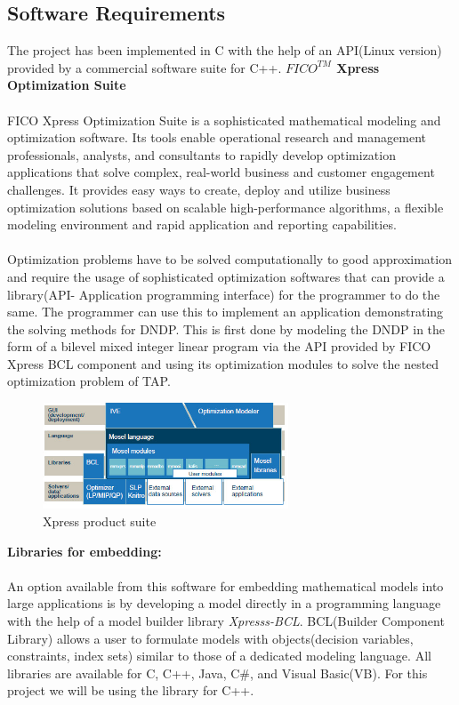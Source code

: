 \documentclass[a4paper, 12pt]{article}
\begin{document}
\subsection{Software Requirements}
The project has been implemented in C with the help of an API(Linux version) provided by a commercial software suite for C++.
\vspace{8mm}
\textbf{\boldmath$FICO^{TM}$ Xpress Optimization Suite}\\~\\
FICO Xpress Optimization Suite is a sophisticated mathematical modeling and optimization software. Its tools enable operational research and management professionals, analysts, and consultants to rapidly develop optimization applications that solve complex, real-world business and customer engagement challenges. It provides easy ways to create, deploy and utilize business optimization solutions based on scalable high-performance algorithms, a flexible modeling environment and rapid application and reporting capabilities.\\~\\
Optimization problems have to be solved computationally to good approximation and require the usage of sophisticated optimization 
softwares that can provide a library(API- Application programming interface) for the programmer to do the same. The programmer can use this to
 implement an application demonstrating the solving methods for DNDP. This is first done by modeling the DNDP in the form of a bilevel mixed 
integer linear program via the API provided by FICO Xpress BCL component and using its optimization modules to solve the nested optimization 
problem of TAP.\par                   
\begin{figure}[h]
\centering
\includegraphics[width=0.65\textwidth, clip]{./Xpress.jpg}
\vspace{-0.15in}
\caption{Xpress product suite}
\label{fig:1}
\end{figure}
\noindent
\textbf{Libraries for embedding:}\\~\\
An option available from this software for embedding mathematical models into large applications is by developing a model directly in a programming language with the help of a model builder library \textit{Xpresss-BCL}. BCL(Builder Component Library) allows a user to formulate models with objects(decision variables, constraints, index sets) similar to those of a dedicated modeling language. All libraries are available for C, C++, Java, C\#, and Visual Basic(VB). For this project we will be using the library for C++.\\ \par
\end{document}
